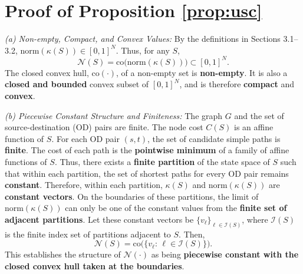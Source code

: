 \documentclass[journal]{IEEEtran}
\begin{document}
\section{Proof of Proposition \ref{prop:usc}}
\label{app:proof_prop_usc}
\begin{IEEEproof}
\textit{(a) Non-empty, Compact, and Convex Values:}
By the definitions in Sections 3.1--3.2, $\mathrm{norm}(\kappa(S))\in[0,1]^N$. Thus, for any $S$,
\begin{equation}
\mathcal N(S)=\mathrm{co}\!\big(\mathrm{norm}(\kappa(S))\big)\subset[0,1]^N.
\end{equation}
The closed convex hull, $\mathrm{co}(\cdot)$, of a non-empty set is \textbf{non-empty}. It is also a \textbf{closed and bounded} convex subset of $[0,1]^N$, and is therefore \textbf{compact} and \textbf{convex}.

\textit{(b) Piecewise Constant Structure and Finiteness:}
The graph $G$ and the set of source-destination (OD) pairs are finite. The node cost $C(S)$ is an affine function of $S$. For each OD pair $(s,t)$, the set of candidate simple paths is \textbf{finite}. The cost of each path is the \textbf{pointwise minimum} of a family of affine functions of $S$. Thus, there exists a \textbf{finite partition} of the state space of $S$ such that within each partition, the set of shortest paths for every OD pair remains \textbf{constant}. Therefore, within each partition, $\kappa(S)$ and $\mathrm{norm}(\kappa(S))$ are \textbf{constant vectors}. On the boundaries of these partitions, the limit of $\mathrm{norm}(\kappa(S))$ can only be one of the constant values from the \textbf{finite set of adjacent partitions}. Let these constant vectors be $\{v_\ell\}_{\ell\in\mathcal I(S)}$, where $\mathcal I(S)$ is the finite index set of partitions adjacent to $S$. Then,
\begin{equation}
\mathcal N(S)=\mathrm{co}\big(\{v_\ell:\,\ell\in\mathcal I(S)\}\big).
\end{equation}
This establishes the structure of $\mathcal N(\cdot)$ as being \textbf{piecewise constant with the closed convex hull taken at the boundaries}.


\end{IEEEproof}
\end{document}
